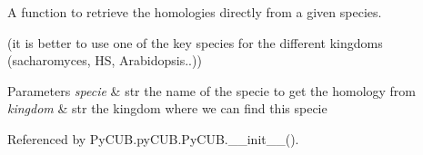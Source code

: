 A function to retrieve the homologies directly from a given species. 

(it is better to use one of the key species for the different kingdoms (sacharomyces, HS, Arabidopsis..))


\begin{DoxyParams}{Parameters}
{\em specie} & str the name of the specie to get the homology from \\
\hline
{\em kingdom} & str the kingdom where we can find this specie \\
\hline
\end{DoxyParams}


Referenced by Py\+C\+U\+B.\+py\+C\+U\+B.\+Py\+C\+U\+B.\+\_\+\+\_\+init\+\_\+\+\_\+().

\mbox{\label{class_py_c_u_b_1_1py_c_u_b_1_1_py_c_u_b_a5e869542b553c1541018263c5386acde}} 
